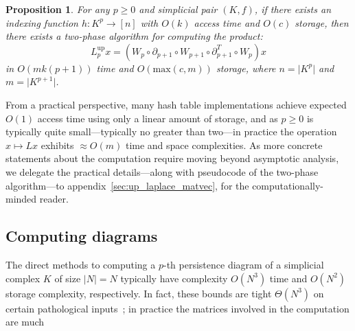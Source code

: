 \documentclass[10pt]{article}
\numberwithin{equation}{section}
\newcommand{\+}{%
	\raisebox{0.18ex}{\scaleobj{0.55}{+}}
}
\newtheorem{proposition}{Proposition}
\theoremstyle{definition}
\theoremstyle{definition}
\begin{document}
\begin{proposition}
	For any $p \geq 0$ and simplicial pair $(K, f)$, if there exists an indexing function $h: K^p \to [n]$ with $O(k)$ access time and $O(c)$ storage, then there exists a two-phase algorithm for computing the product: 
	\begin{equation}
		L_p^{\mathrm{up}} x = (W_p \circ \partial_{p+1} \circ W_{p+1} \circ \partial_{p+1}^T \circ W_p)x
	\end{equation}
	in $O(mk(p+1))$ time and $O(\mathrm{max}(c,m))$ storage, where $n = \lvert K^p \rvert$ and $m = \lvert K^{p+1} \rvert$. 
\end{proposition}
\noindent From a practical perspective, many hash table implementations achieve expected $O(1)$ access time using only a linear amount of storage, and as $p \geq 0$ is typically quite small---typically no greater than two---in practice the operation $x \mapsto L x$ exhibits $\approx O(m)$ time and space complexities. 
As more concrete statements about the computation require moving beyond asymptotic analysis, we delegate the practical details---along with pseudocode of the two-phase algorithm---to appendix~\ref{sec:up_laplace_matvec}, for the computationally-minded reader.


\subsection{Computing diagrams}\label{sec:pers_alg}
The direct methods to computing a $p$-th persistence diagram of a simplicial complex $K$ of size $\lvert N \rvert = N$ typically have complexity $O(N^3)$ time and $O(N^2)$ storage complexity, respectively. In fact, these bounds are tight $\Theta(N^3)$ on certain pathological inputs~\cite{}; in practice the matrices involved in the computation are much 


\end{document}
